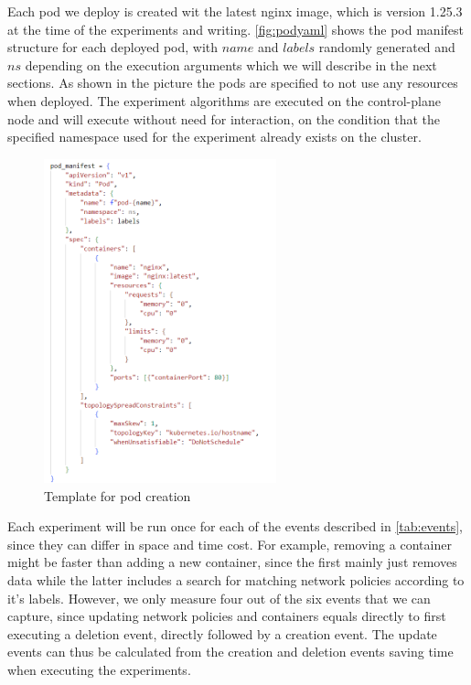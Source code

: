 Each pod we deploy is created wit the latest nginx image, which is version 1.25.3 at the time of the experiments and writing. \autoref{fig:podyaml} shows the pod manifest structure for each deployed pod, with $name$ and $labels$ randomly generated and $ns$ depending on the execution arguments which we will describe in the next sections. As shown in the picture the pods are specified to not use any resources when deployed. The experiment algorithms are executed on the control-plane node and will execute without need for interaction, on the condition that the specified namespace used for the experiment already exists on the cluster.
\\[10pt]
\begin{figure}[htbp]
  \centering
  \includegraphics[width=0.6\textwidth]{images/podyaml.png} 
  \caption{Template for pod creation}
  \label{fig:podyaml}
\end{figure}

Each experiment will be run once for each of the events described in \autoref{tab:events}, since they can differ in space and time cost. For example, removing a container might be faster than adding a new container, since the first mainly just removes data while the latter includes a search for matching network policies according to it's labels. However, we only measure four out of the six events that we can capture, since updating network policies and containers equals directly to first executing a deletion event, directly followed by a creation event. The update events can thus be calculated from the creation and deletion events saving time when executing the experiments.
\\[10pt]

